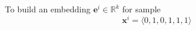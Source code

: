 \documentclass[10pt, t, xcolor={usenames,dvipsnames,svgnames}, compress]{beamer}
\begin{document}
\begin{frame}
\begin{minipage}{0.4\linewidth}
\begin{center}
    \end{center}
  \end{minipage}\hfill\begin{minipage}[t]{0.55\linewidth}
    \vspace{-80pt}
    To build an embedding $\mathbf{e}^{i}\in\mathbb{R}^{k}$ for sample
    $$\mathbf{x}^{i}=\langle 0,1,0,1,1,1 \rangle$$
    

\end{minipage}
\end{frame}
\end{document}
